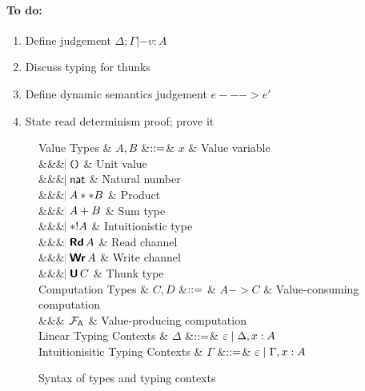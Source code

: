 \documentclass{llncs}
\begin{document}
\paragraph{To do:}
\begin{enumerate}
\item Define judgement $\Delta; \Gamma |- v : A$
\item Discuss typing for thunks
\item Define dynamic semantics judgement $e ---> e'$
\item State read determinism proof; prove it
\end{enumerate}


\begin{figure}[htbp]
  \centering

\begin{grammar}
  Value Types
  & $A,B$
      &$\mathrel{::=}$&
      $x$ & Value variable
      \\ &&& $\bnfaltbrk \unitexp$ & Unit value
      \\ &&& $\hspace{-1.02ex}\mathrel{\mid} \mathsf{nat}$         & Natural number
      \\ &&& $\hspace{-1.02ex}\mathrel{\mid} A ** B$ & Product
      \\ &&& $\hspace{-1.02ex}\mathrel{\mid} A + B$ & Sum type
      \\ &&& $\hspace{-1.02ex}\mathrel{\mid} *! A$ & Intuitionistic type
      \\ &&& $\bnfaltbrk \Rd A$ & Read channel
      \\ &&& $\bnfaltbrk \Wr A$ & Write channel
      \\ &&& $\bnfaltbrk \U C$ & Thunk type
  \\[1ex]
  Computation Types
  & $C, D$
      &$\mathrel{::=}$ & 
             $A -> C$ & Value-consuming computation
      \\ &&& $\hspace{-1.02ex}\mathrel{\mid} {\cal F}_{\textnormal{\ensuremath{{\mathsf {{A}}}}}}$ & Value-producing computation
  \\[1ex]
  Linear Typing Contexts
  & $\Delta$
     &$\mathrel{::=}$& $\varepsilon \mathrel{\mid} \Delta,x:A$
  \\
  Intuitionisitic Typing Contexts
  & $\Gamma$
     &$\mathrel{::=}$& $\varepsilon \mathrel{\mid} \Gamma,x:A$
\end{grammar}

  \caption{Syntax of types and typing contexts}
  \label{fig:expr}
\end{figure}
\end{document}
